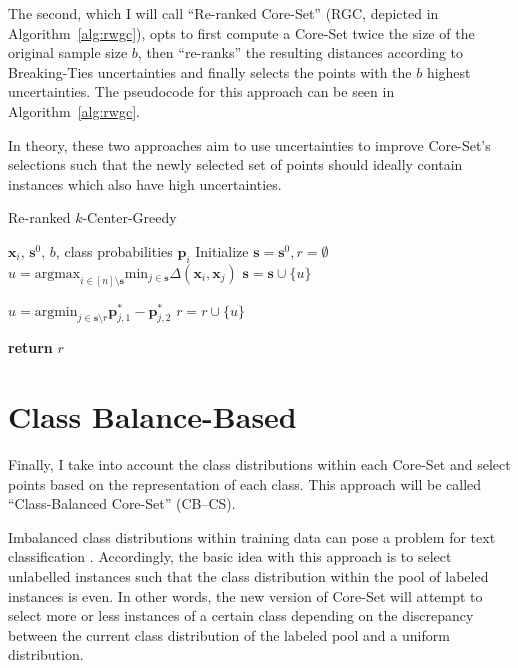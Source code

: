 \documentclass[english,bachelor,ul]{webisthesis} %
\begin{document}
The second, which I will call ``Re-ranked Core-Set'' (RGC, depicted in Algorithm~\ref{alg:rwgc}), opts to first compute a Core-Set twice the size of the original sample size $b$, then ``re-ranks'' the resulting distances according to Breaking-Ties uncertainties and finally selects the points with the $b$ highest uncertainties. The pseudocode for this approach can be seen in Algorithm~\ref{alg:rwgc}.

In theory, these two approaches aim to use uncertainties to improve Core-Set's selections such that the newly selected set of points should ideally contain instances which also have high uncertainties.

\begin{algorithm}[htpb]
\caption{Re-ranked $k$-Center-Greedy}%
\label{alg:rwgc}
\begin{algorithmic}

\Require $ \mathbf{x}_i $, $ \mathbf{s}^0 $, $ b $, class probabilities $ \mathbf{p}_i $
\State Initialize $ \mathbf{s} = \mathbf{s}^0, r = \emptyset $
\Repeat
\State $ u = \text{argmax}_{i \in [n] \setminus \mathbf{s}} \text{min}_{j \in \mathbf{s}} \Delta(\mathbf{x}_i, \mathbf{x}_j) $
\State $ \mathbf{s} = \mathbf{s} \cup \{u\} $



\Repeat
\State $ u = \text{argmin}_{j \in \mathbf{s} \setminus r}\mathbf{p}_{j, 1}^* - \mathbf{p}_{j, 2}^* $
\State $ r = r \cup \{u\} $

\State \textbf{return} $ r $
\end{algorithmic}
\end{algorithm}

\section{Class Balance-Based}

Finally, I take into account the class distributions within each Core-Set and select points based on the representation of each class. This approach will be called ``Class-Balanced Core-Set'' (CB--CS).

Imbalanced class distributions within training data can pose a problem for text classification \citep{DBLP:conf/eacl/HenningBFF23}. Accordingly, the basic idea with this approach is to select unlabelled instances such that the class distribution within the pool of labeled instances is even. In other words, the new version of Core-Set will attempt to select more or less instances of a certain class depending on the discrepancy between the current class distribution of the labeled pool and a uniform distribution.
\end{document}
